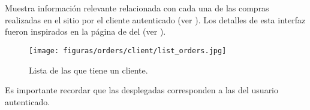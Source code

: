 \section{\ordersEF}\label{chapter:solucionimplementada:section:orders}
Muestra información relevante relacionada con cada una de las compras realizadas en el sitio por el cliente autenticado (ver ). Los detalles de esta interfaz fueron inspirados en la página de \ordersEF del \websiteINT \dealextremeNAME (ver ).  


\begin{figure}[H]
	\centering
	\texttt{[image: figuras/orders/client/list\_orders.jpg]}
	\caption{Lista de las \ordersEF que tiene un cliente.}
	\label{figure:orders:client:list_orders}
\end{figure}

Es importante recordar que las \ordersEF desplegadas corresponden a las del usuario autenticado.